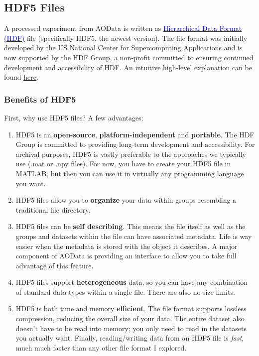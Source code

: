 \documentclass[10pt]{exam}
\newcommand\myurl[1]{\textcolor{blue}{\underline{#1}}}
\begin{document}
	\subsection{HDF5 Files} \label{subsection:HDF5_Intro}
		\noindent A processed experiment from AOData is written as \href{https://portal.hdfgroup.org/display/support}{\myurl{Hierarchical Data Format (HDF)}} file (specifically HDF5, the newest version). The file format was initially developed by the US National Center for Supercomputing Applications and is now supported by the HDF Group, a non-profit committed to ensuring continued development and accessibility of HDF. An intuitive high-level explanation can be found \myurl{\href{https://www.neonscience.org/resources/learning-hub/tutorials/about-hdf5}{here}}.			
		\subsubsection{Benefits of HDF5}
			\noindent First, why use HDF5 files? A few advantages:
			\begin{enumerate}
				\item HDF5 is an \textbf{open-source}, \textbf{platform-independent} and \textbf{portable}. The HDF Group is committed to providing long-term development and accessibility. For archival purposes, HDF5 is vastly preferable to the approaches we typically use (.mat or .npy files). For now, you have to create your HDF5 file in MATLAB, but then you can use it in virtually any programming language you want.%
				\item HDF5 files allow you to \textbf{organize} your data within groups resembling a traditional file directory.
				\item HDF5 files can be \textbf{self describing}. This means the file itself as well as the groups and datasets within the file can have associated metadata. Life is way easier when the metadata is stored with the object it describes. A major component of AOData is providing an interface to allow you to take full advantage of this feature.
				\item HDF5 files support \textbf{heterogeneous} data, so you can have any combination of standard data types within a single file. There are also no size limits.
				\item HDF5 is both time and memory \textbf{efficient}. The file format supports lossless compression, reducing the overall size of your data. The entire dataset also doesn't have to be read into memory; you only need to read in the datasets you actually want. Finally, reading/writing data from an HDF5 file is \textit{fast}, much much faster than any other file format I explored. 
			\end{enumerate}
			
\end{document}
